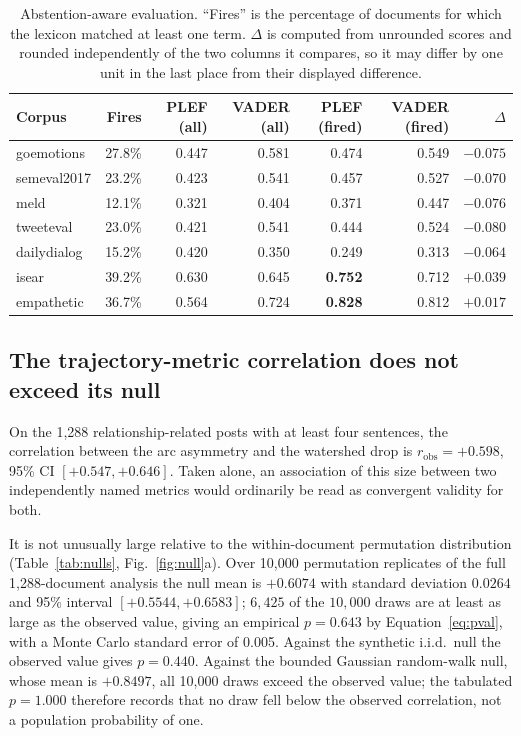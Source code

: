 \documentclass[fleqn,10pt]{wlscirep}
\providecommand{\botrule}{\bottomrule}
\begin{document}
\begin{table}[ht]
\centering
\caption{Abstention-aware evaluation. ``Fires'' is the percentage of documents for which the lexicon matched at least one term. $\Delta$ is computed from unrounded scores and rounded independently of the two columns it compares, so it may differ by one unit in the last place from their displayed difference.}
\label{tab:abst}
\begin{tabular}{lrrrrrr}
\toprule
Corpus & Fires & PLEF (all) & VADER (all) & PLEF (fired) & VADER (fired) & $\Delta$ \\
\midrule
goemotions   & 27.8\% & 0.447 & 0.581 & 0.474 & 0.549 & $-0.075$ \\
semeval2017  & 23.2\% & 0.423 & 0.541 & 0.457 & 0.527 & $-0.070$ \\
meld         & 12.1\% & 0.321 & 0.404 & 0.371 & 0.447 & $-0.076$ \\
tweeteval    & 23.0\% & 0.421 & 0.541 & 0.444 & 0.524 & $-0.080$ \\
dailydialog  & 15.2\% & 0.420 & 0.350 & 0.249 & 0.313 & $-0.064$ \\
\midrule
isear        & 39.2\% & 0.630 & 0.645 & \textbf{0.752} & 0.712 & $+0.039$ \\
empathetic   & 36.7\% & 0.564 & 0.724 & \textbf{0.828} & 0.812 & $+0.017$ \\
\botrule
\end{tabular}
\end{table}

\subsection{The trajectory-metric correlation does not exceed its null}\label{subsec:null}

On the 1{,}288 relationship-related posts with at least four sentences, the correlation between the arc asymmetry and the watershed drop is $r_{\mathrm{obs}} = +0.598$, 95\% CI $[+0.547, +0.646]$. Taken alone, an association of this size between two independently named metrics would ordinarily be read as convergent validity for both.

It is not unusually large relative to the within-document permutation distribution (Table~\ref{tab:nulls}, Fig.~\ref{fig:null}a). Over 10{,}000 permutation replicates of the full 1{,}288-document analysis the null mean is $+0.6074$ with standard deviation $0.0264$ and 95\% interval $[+0.5544, +0.6583]$; $6{,}425$ of the $10{,}000$ draws are at least as large as the observed value, giving an empirical $p = 0.643$ by Equation~\eqref{eq:pval}, with a Monte Carlo standard error of 0.005. Against the synthetic i.i.d.\ null the observed value gives $p = 0.440$. Against the bounded Gaussian random-walk null, whose mean is $+0.8497$, all 10{,}000 draws exceed the observed value; the tabulated $p=1.000$ therefore records that no draw fell below the observed correlation, not a population probability of one.
\end{document}
